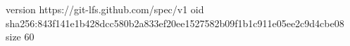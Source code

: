 version https://git-lfs.github.com/spec/v1
oid sha256:843f141e1b428dcc580b2a833ef20ee1527582b09f1b1c911e05ee2c9d4cbe08
size 60
